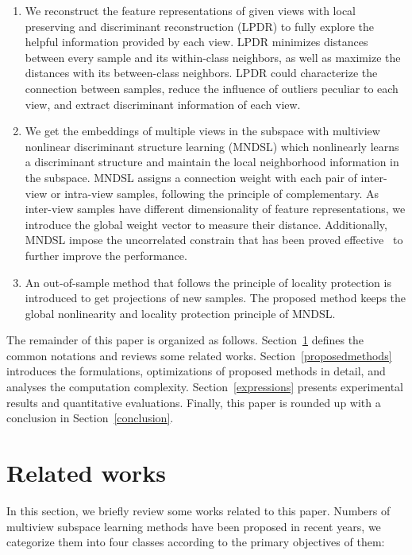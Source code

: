 \documentclass[journal]{IEEEtran}
\begin{document}
\begin{enumerate}
\item We reconstruct the feature representations of given views with local preserving and discriminant reconstruction (LPDR) to fully explore the helpful information provided by each view. 
LPDR minimizes distances between every sample and its within-class neighbors, as well as maximize the distances with its between-class neighbors. 
LPDR could characterize the connection between samples, reduce the influence of outliers peculiar to each view, and extract discriminant information of each view. 

\item We get the embeddings of multiple views in the subspace with multiview nonlinear discriminant structure learning (MNDSL) which nonlinearly learns a discriminant structure and maintain the local neighborhood information in the subspace. 
MNDSL assigns a connection weight with each pair of inter-view or intra-view samples, following the principle of complementary. 
As inter-view samples have different dimensionality of feature representations, we introduce the global weight vector to measure their distance. 
Additionally, MNDSL impose the uncorrelated constrain that has been proved effective~\cite{MUDA,MVLPP} to further improve the performance. 

\item An out-of-sample method that follows the principle of locality protection is introduced to get projections of new samples. 
The proposed method keeps the global nonlinearity and locality protection principle of MNDSL. 
\end{enumerate}

The remainder of this paper is organized as follows. 
Section~\ref{relatedworks} defines the common notations and reviews some related works. 
Section~\ref{proposedmethods} introduces the formulations, optimizations of proposed methods in detail, and analyses the computation complexity. 
Section~\ref{expressions} presents experimental results and quantitative evaluations. 
Finally, this paper is rounded up with a conclusion in Section~\ref{conclusion}. 


\section{Related works} \label{relatedworks}
In this section, we briefly review some works related to this paper. 
Numbers of multiview subspace learning methods have been proposed in recent years, 
we categorize them into four classes according to the primary objectives of them: 
\end{document}
